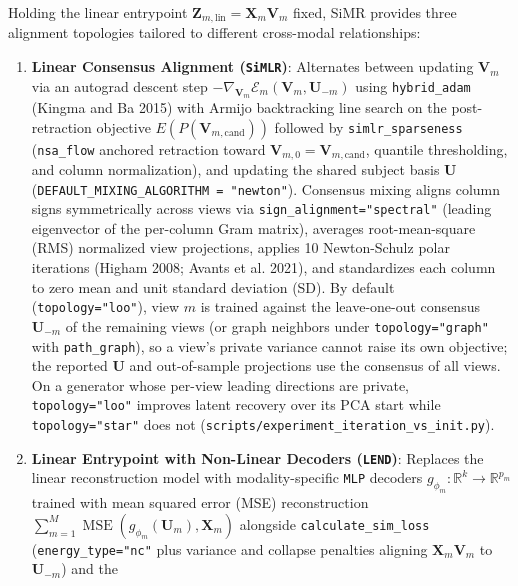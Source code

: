 \documentclass[
  10pt,
  letterpaper,
]{report}
\providecommand{\tightlist}{%
  \setlength{\itemsep}{0pt}\setlength{\parskip}{0pt}}
\begin{document}
Holding the linear entrypoint
\(\mathbf{Z}_{m,\text{lin}} = \mathbf{X}_m \mathbf{V}_m\) fixed, SiMR
provides three alignment topologies tailored to different cross-modal
relationships:

\begin{enumerate}
\def\labelenumi{\arabic{enumi}.}
\tightlist
\item
  \textbf{Linear Consensus Alignment (\texttt{SiMLR})}: Alternates
  between updating \(\mathbf{V}_m\) via an autograd descent step
  \(-\nabla_{\mathbf{V}_m}\mathcal{E}_m(\mathbf{V}_m, \mathbf{U}_{-m})\)
  using \texttt{hybrid\_adam} (Kingma and Ba 2015) with Armijo
  backtracking line search on the post-retraction objective
  \(E(P(\mathbf{V}_{m,\text{cand}}))\) followed by
  \texttt{simlr\_sparseness} (\texttt{nsa\_flow} anchored retraction
  toward \(\mathbf{V}_{m,0} = \mathbf{V}_{m,\text{cand}}\), quantile
  thresholding, and column normalization), and updating the shared
  subject basis \(\mathbf{U}\)
  (\texttt{DEFAULT\_MIXING\_ALGORITHM\ =\ "newton"}). Consensus mixing
  aligns column signs symmetrically across views via
  \texttt{sign\_alignment="spectral"} (leading eigenvector of the
  per-column Gram matrix), averages root-mean-square (RMS) normalized
  view projections, applies 10 Newton-Schulz polar iterations (Higham
  2008; Avants et al. 2021), and standardizes each column to zero mean
  and unit standard deviation (SD). By default
  (\texttt{topology="loo"}), view \(m\) is trained against the
  leave-one-out consensus \(\mathbf{U}_{-m}\) of the remaining views (or
  graph neighbors under \texttt{topology="graph"} with
  \texttt{path\_graph}), so a view's private variance cannot raise its
  own objective; the reported \(\mathbf{U}\) and out-of-sample
  projections use the consensus of all views. On a generator whose
  per-view leading directions are private, \texttt{topology="loo"}
  improves latent recovery over its PCA start while
  \texttt{topology="star"} does not
  (\texttt{scripts/experiment\_iteration\_vs\_init.py}).
\item
  \textbf{Linear Entrypoint with Non-Linear Decoders (\texttt{LEND})}:
  Replaces the linear reconstruction model with modality-specific
  \texttt{MLP} decoders
  \(g_{\phi_m} : \mathbb{R}^k \to \mathbb{R}^{p_m}\) trained with mean
  squared error (MSE) reconstruction
  \(\sum_{m=1}^M \operatorname{MSE}(g_{\phi_m}(\mathbf{U}_m), \mathbf{X}_m)\)
  alongside \texttt{calculate\_sim\_loss} (\texttt{energy\_type="nc"}
  plus variance and collapse penalties aligning
  \(\mathbf{X}_m \mathbf{V}_m\) to \(\mathbf{U}_{-m}\)) and the

\end{enumerate}
\end{document}

